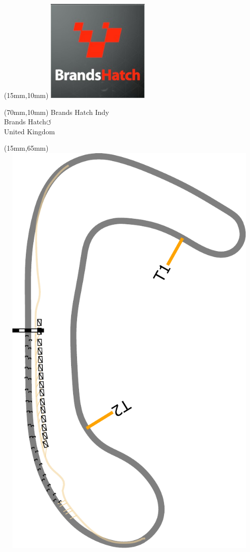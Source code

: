 \null\newpage
\begin{textblock*}{50mm}(15mm,10mm)%
\includegraphics[width=50mm]{LG/2015-05-20_00074.png}
\end{textblock*}
\begin{textblock*}{130mm}(70mm,10mm)%
{\fontsize{20}{20}\selectfont Brands Hatch Indy\\}
{\fontsize{16}{16}\selectfont Brands Hatch\hfill \huge$\circlearrowleft$\\}
{\fontsize{12}{12}\selectfont United Kingdom\\}
\end{textblock*}
\begin{textblock*}{185mm}(15mm,65mm)%
\centering
\mbox{\includegraphics[width=185mm,height=210mm,keepaspectratio]{PT/BRHAIN.pdf}}
\end{textblock*}
